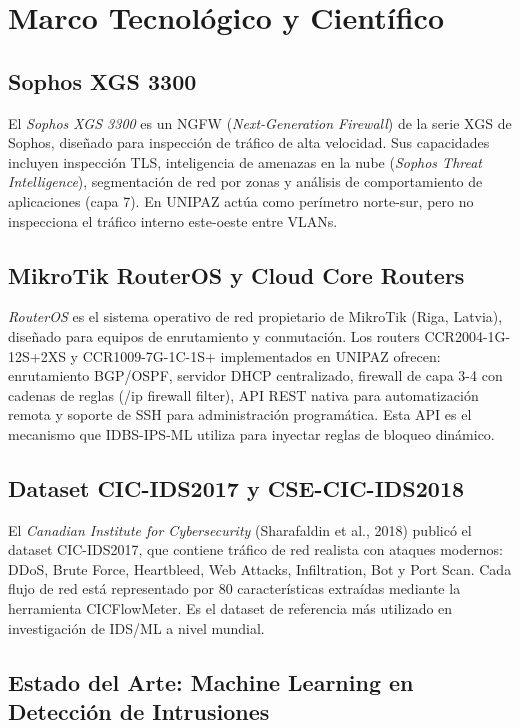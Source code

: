 \documentclass[12pt, letterpaper, oneside]{report}
\begin{document}
\section{Marco Tecnológico y Científico}

\subsection{Sophos XGS 3300}
El \textit{Sophos XGS 3300} es un NGFW (\textit{Next-Generation Firewall}) de la serie XGS de Sophos, diseñado para inspección de tráfico de alta velocidad. Sus capacidades incluyen inspección TLS, inteligencia de amenazas en la nube (\textit{Sophos Threat Intelligence}), segmentación de red por zonas y análisis de comportamiento de aplicaciones (capa 7). En UNIPAZ actúa como perímetro norte-sur, pero no inspecciona el tráfico interno este-oeste entre VLANs.

\subsection{MikroTik RouterOS y Cloud Core Routers}
\textit{RouterOS} es el sistema operativo de red propietario de MikroTik (Riga, Latvia), diseñado para equipos de enrutamiento y conmutación. Los routers CCR2004-1G-12S+2XS y CCR1009-7G-1C-1S+ implementados en UNIPAZ ofrecen: enrutamiento BGP/OSPF, servidor DHCP centralizado, firewall de capa 3-4 con cadenas de reglas (/ip firewall filter), API REST nativa para automatización remota y soporte de SSH para administración programática. Esta API es el mecanismo que IDBS-IPS-ML utiliza para inyectar reglas de bloqueo dinámico.

\subsection{Dataset CIC-IDS2017 y CSE-CIC-IDS2018}
El \textit{Canadian Institute for Cybersecurity} (Sharafaldin et al., 2018) publicó el dataset CIC-IDS2017, que contiene tráfico de red realista con ataques modernos: DDoS, Brute Force, Heartbleed, Web Attacks, Infiltration, Bot y Port Scan. Cada flujo de red está representado por 80 características extraídas mediante la herramienta CICFlowMeter. Es el dataset de referencia más utilizado en investigación de IDS/ML a nivel mundial.

\subsection{Estado del Arte: Machine Learning en Detección de Intrusiones}
\end{document}
